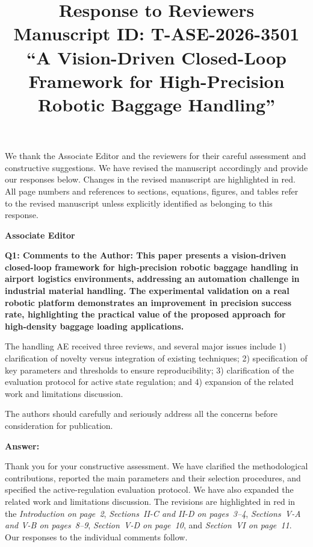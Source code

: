 \documentclass[journal,10pt]{IEEEtran}
\newcommand{\reviewer}[1]{%
  \par\smallskip\noindent
  \textcolor{responseblue}{\textbf{#1\hspace{0.2em}}}\par\nobreak%
}
\newcommand{\question}[2]{%
  \par\smallskip\noindent
  {\color{responseblue}\bfseries\clubpenalty=10000\widowpenalty=10000 Q#1: #2\par}%
  \par\nobreak\noindent
}
\newcommand{\answer}{%
  \par\smallskip\noindent
  \textbf{Answer: }\ignorespaces
}
\newcommand{\PaperID}{T-ASE-2026-3501}
\newcommand{\PaperTitle}{A Vision-Driven Closed-Loop Framework for High-Precision Robotic Baggage Handling}
\begin{document}
\title{\LARGE\bfseries Response to Reviewers\\
  \normalfont\normalsize Manuscript ID: \PaperID\\
  \normalfont ``\PaperTitle''}
\maketitle

We thank the Associate Editor and the reviewers for their careful assessment and constructive suggestions. We have revised the manuscript accordingly and provide our responses below. Changes in the revised manuscript are highlighted in red. All page numbers and references to sections, equations, figures, and tables refer to the revised manuscript unless explicitly identified as belonging to this response.

\reviewer{Associate Editor}
\question{1}{Comments to the Author:
This paper presents a vision-driven closed-loop framework for high-precision robotic baggage handling in airport logistics environments, addressing an automation challenge in industrial material handling. The experimental validation on a real robotic platform demonstrates an improvement in precision success rate, highlighting the practical value of the proposed approach for high-density baggage loading applications.

The handling AE received three reviews, and several major issues include 1) clarification of novelty versus integration of existing techniques; 2) specification of key parameters and thresholds to ensure reproducibility; 3) clarification of the evaluation protocol for active state regulation; and 4) expansion of the related work and limitations discussion.

The authors should carefully and seriously address all the concerns before consideration for publication.}

\answer
Thank you for your constructive assessment. We have clarified the methodological contributions, reported the main parameters and their selection procedures, and specified the active-regulation evaluation protocol. We have also expanded the related work and limitations discussion. The revisions are highlighted in red in the \textit{Introduction on page~2}, \textit{Sections~II-C and II-D on pages~3--4}, \textit{Sections~V-A and V-B on pages~8--9}, \textit{Section~V-D on page~10}, and \textit{Section~VI on page~11}. Our responses to the individual comments follow.
\end{document}
